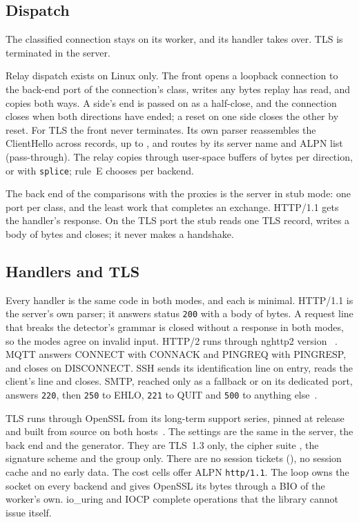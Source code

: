 \subsection{Dispatch}\label{sec:dispatch}

 The classified connection stays on its worker, and its handler takes over.
TLS is terminated in the server.

 Relay dispatch exists on Linux only. The front opens a loopback connection to the
back-end port of the connection's class, writes any bytes replay has read, and copies both ways.
A side's end is passed on as a half-close, and the connection closes when both directions have
ended; a reset on one side closes the other by reset. For TLS the front never terminates. Its own
parser reassembles the ClientHello across records, up to \Bch{}, and routes by its server name
and ALPN list (pass-through). The relay copies through user-space buffers of \RelayBuf{} bytes
per direction, or with \texttt{splice}; rule~E chooses per backend.

 The back end of the comparisons with the proxies is the server in stub mode:
one port per class, and the least work that completes an exchange. HTTP/1.1 gets the handler's
response. On the TLS port the stub reads one TLS record, writes a body of \BodyBytes{} bytes and
closes; it never makes a handshake.

\subsection{Handlers and TLS}\label{sec:handlers}

Every handler is the same code in both modes, and each is minimal. HTTP/1.1 is the server's own
parser; it answers status \texttt{200} with a body of \BodyBytes{} bytes. A request line that
breaks the detector's grammar is closed without a response in both modes, so the modes agree on
invalid input. HTTP/2 runs through nghttp2 version \NghttpVersion~\cite{nghttp22026}. MQTT answers
CONNECT with CONNACK and PINGREQ with PINGRESP, and closes on DISCONNECT. SSH sends its identification line \SshLine{} on entry, reads the
client's line and closes. SMTP, reached only as a fallback or on its dedicated port, answers
\texttt{220}, then \texttt{250} to EHLO, \texttt{221} to QUIT and \texttt{500} to anything
else~\cite{klensin2008rfc5321}.

TLS runs through OpenSSL from its \OpensslSeries{} long-term support series, pinned at release
\OpensslVersion{} and built from source on both hosts~\cite{openssl2026}. The settings are the
same in the server, the back end and the generator. They are TLS~1.3 only, the cipher suite
\CipherSuite, the signature scheme \SigScheme{} and the group \GroupX{} only. There are no session
tickets (\NoTickets), no session cache and no early data. The cost cells offer ALPN
\texttt{http/1.1}. The loop owns the socket on every backend and gives OpenSSL its bytes through a
BIO of the worker's own. io\_uring and IOCP complete operations that the library cannot issue
itself.

